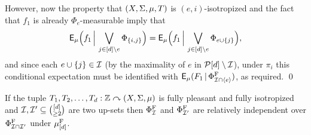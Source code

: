 \documentclass[12pt]{article}
\begin{document}
However, now the property that $(X,\S,\mu,T)$ is $(e,i)$-isotropized
and the fact that $f_1$ is already $\Phi_e$-measurable imply that
\[\sfE_\mu\Big(f_1\,\Big|\,\bigvee_{j\in[d]\setminus e}\Phi_{\{i,j\}}\Big) = \sfE_\mu\Big(f_1\,\Big|\,\bigvee_{j\in [d]\setminus e} \Phi_{e \cup \{j\}}\Big),\]
and since each $e \cup \{j\} \in \cal{I}$ (by the maximality of $e$
in $\cal{P}[d]\setminus\cal{I}$), under $\pi_i$ this conditional
expectation must be identified with
$\sfE_\mu(F_1\,|\,\Phi^{\rm{F}}_{\cal{I}\cap\langle e\rangle})$, as
required. \qed

\begin{cor}\label{cor:Fberg-struct}
If the tuple $T_1,T_2,\ldots,T_d:\bbZ\curvearrowright(X,\S,\mu)$ is
fully pleasant and fully isotropized and $\cal{I},\cal{I}'\subseteq
\binom{[d]}{\geq 2}$ are two up-sets then $\Phi^{\rm{F}}_{\cal{I}}$
and $\Phi^{\rm{F}}_{\cal{I}'}$ are relatively independent over
$\Phi^{\rm{F}}_{\cal{I}\cap\cal{I}'}$ under $\mu^{\rm{F}}_{[d]}$.
\end{cor}
\end{document}
